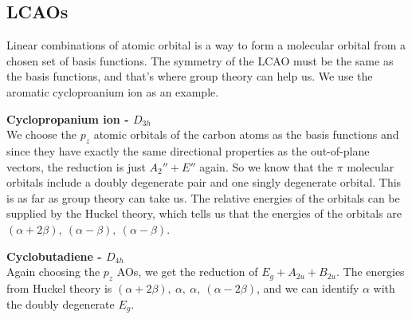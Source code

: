 \subsection{LCAOs}
Linear combinations of atomic orbital is a way to form a molecular orbital from a chosen set of basis functions. The symmetry of the LCAO must be the same as the basis functions, and that's where group theory can help us. We use the aromatic cycloproanium ion as an example.\par
\textbf{Cyclopropanium ion - $D_{3h}$}\\
We choose the $p_z$ atomic orbitals of the carbon atoms as the basis functions and since they have exactly the same directional properties as the out-of-plane vectors, the reduction is just $A_2''+E''$ again. 
So we know that the $\pi$ molecular orbitals include a doubly degenerate pair and one singly degenerate orbital. This is as far as group theory can take us. The relative energies of the orbitals can be supplied by the Huckel theory, which tells us that the energies of the orbitals are $(\alpha+2\beta),\ (\alpha-\beta),\ (\alpha-\beta)$.\par
\textbf{Cyclobutadiene - $D_{4h}$}\\
Again choosing the $p_z$ AOs, we get the reduction of $E_g+A_{2u}+B_{2u}$. The energies from Huckel theory is $(\alpha+2\beta),\ \alpha,\ \alpha,\ (\alpha-2\beta)$, and we can identify $\alpha$ with the doubly degenerate $E_g$.
